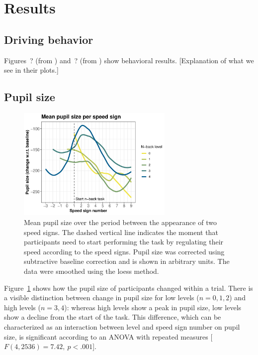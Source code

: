 
\section{Results}\label{sec:results}
\subsection{Driving behavior}
Figures~? (from \citet{DeMooij2021}) and~? (from \citet{Kelapanda2021}) show behavioral results.
[Explanation of what we see in their plots.]

\subsection{Pupil size}
\begin{figure}
  \centering
  \includegraphics[width=7.5cm]{images/speed_sign_nback.pdf}
  \caption{Mean pupil size over the period between the appearance of two speed signs.
  The dashed vertical line indicates the moment that participants need to start performing the \nback task by regulating their speed according to the speed signs.
  Pupil size was corrected using subtractive baseline correction and is shown in arbitrary units. 
  The data were smoothed using the loess method.}
  \label{fig:ps-speed-sign}
\end{figure}

Figure~\ref{fig:ps-speed-sign} shows how the pupil size of participants changed within a trial.
There is a visible distinction between change in pupil size for low \nback levels (\(n = 0,1,2\)) and high \nback levels (\(n = 3,4\)):
whereas high \nback levels show a peak in pupil size, low \nback levels show a decline from the start of the task.
This difference, which can be characterized as an interaction between \nback level and speed sign number on pupil size, is significant according to an ANOVA with repeated measures [\(F(4,2536)=7.42,\ p < .001\)].

